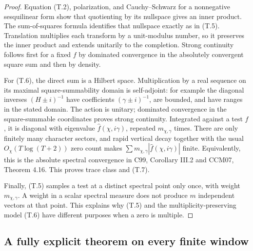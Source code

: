 \begin{proof}
Equation (T.2), polarization, and Cauchy--Schwarz for a
nonnegative sesquilinear form show that quotienting by
its nullspace gives an inner product. The sum-of-squares
formula identifies that nullspace exactly as in (T.5).
Translation multiplies each transform by a unit-modulus
number, so it preserves the inner product and extends
unitarily to the completion. Strong continuity follows
first for a fixed \(f\) by dominated convergence in the
absolutely convergent square sum and then by density.

For (T.6), the direct sum is a Hilbert space. Multiplication
by a real sequence on its maximal square-summability
domain is self-adjoint: for example the diagonal inverses
\((H\pm i)^{-1}\) have coefficients \((\gamma\pm i)^{-1}\),
are bounded, and have ranges in the stated domain.
The action is unitary; dominated convergence in the
square-summable coordinates proves strong continuity.
Integrated against a test \(f\), it is diagonal with
eigenvalue \(\widehat f(\chi,i\gamma)\), repeated
\(m_{\chi,\gamma}\) times. There are only finitely many
character sectors, and rapid vertical decay together
with the usual \(O_\chi(T\log(T+2))\) zero count makes
\(\sum m_{\chi,\gamma}|\widehat f(\chi,i\gamma)|\) finite.
Equivalently, this is the absolute spectral convergence
in C99, Corollary III.2 and CCM07, Theorem 4.16.
This proves trace class and (T.7).

Finally, (T.5) samples a test at a distinct spectral point
only once, with weight \(m_{\chi,\gamma}\). A weight in
a scalar spectral measure does not produce \(m\)
independent vectors at that point. This explains why
(T.5) and the multiplicity-preserving model (T.6) have
different purposes when a zero is multiple.
\end{proof}

\subsection{A fully explicit theorem on every finite window}

